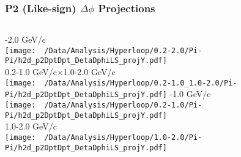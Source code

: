 \documentclass{beamer}
\begin{document}
\begin{frame}
	\frametitle{P2 (Like-sign) $\Delta\phi$ Projections}
	\begin{columns}
		-2.0 GeV/c\\
		\texttt{[image: ~/Data/Analysis/Hyperloop/0.2-2.0/Pi-Pi/h2d\_p2DptDpt\_DetaDphiLS\_projY.pdf]}\\0.2-1.0 GeV/c$\times$1.0-2.0 GeV/c\\
		\texttt{[image: ~/Data/Analysis/Hyperloop/0.2-1.0\_1.0-2.0/Pi-Pi/h2d\_p2DptDpt\_DetaDphiLS\_projY.pdf]}
		-1.0 GeV/c\\
		\texttt{[image: ~/Data/Analysis/Hyperloop/0.2-1.0/Pi-Pi/h2d\_p2DptDpt\_DetaDphiLS\_projY.pdf]}\\1.0-2.0 GeV/c\\
		\texttt{[image: ~/Data/Analysis/Hyperloop/1.0-2.0/Pi-Pi/h2d\_p2DptDpt\_DetaDphiLS\_projY.pdf]}
	\end{columns}
\end{frame}
\end{document}

